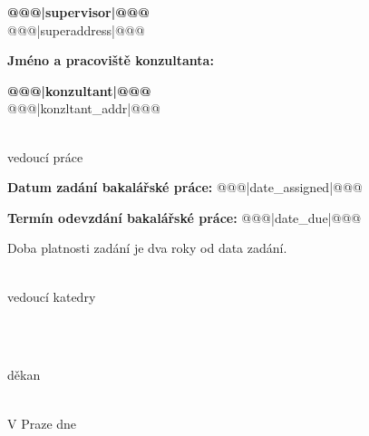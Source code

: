 \documentclass[a4paper,11pt,twoside,final]{article}
\begin{document}
\begin{titlepage}
\textbf{@@@|supervisor|@@@} \\
@@@|superaddress|@@@ \\
\par
\textbf{Jméno a pracoviště konzultanta:}

\textbf{@@@|konzultant|@@@} \\
@@@|konzltant_addr|@@@
\par
\vfill
\hfill
\begin{minipage}{0.3\textwidth}

\begin{center}

\dotfill\\
    vedoucí práce
\end{center}
\end{minipage}

\vfill
\textbf{Datum zadání bakalářské práce:} @@@|date_assigned|@@@

\textbf{Termín odevzdání bakalářské práce:} @@@|date_due|@@@

Doba platnosti zadání je dva roky od data zadání.\\[4cm]

\begin{minipage}{0.3\textwidth}
  \begin{center}\dotfill\\
      vedoucí katedry
  \end{center}
\end{minipage}
~\hfill
\begin{minipage}{0.3\textwidth}
  \begin{center}
  \dotfill\\
  děkan
  \end{center}
\end{minipage}
\\[2cm]

V Praze dne
\end{titlepage}
\end{document}
